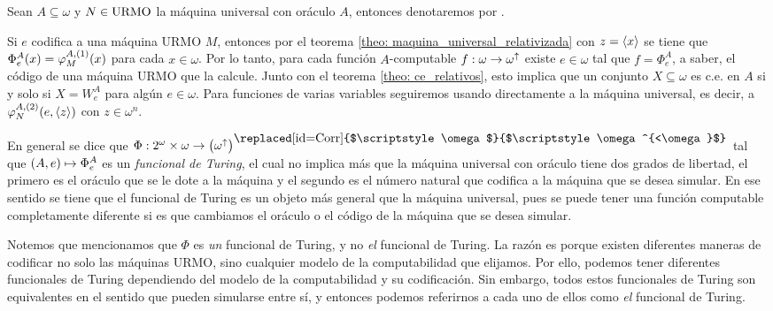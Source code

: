 \begin{agregado}
\begin{notation}
	Sean $A\subseteq\omega$ y $N\in\URMO$ la máquina universal con oráculo $A$, entonces denotaremos por .

	 
\end{notation}

\begin{correccion}
Si $e$ codifica a una máquina URMO $M$, entonces por el teorema \ref{theo: maquina_universal_relativizada} con $z =\inner*{x}$ se tiene que $\Phi_{e}^{A}\pa*{x} =\varphi_{M}^{A, (1)}\pa*{x}$ para cada $x\in\omega$. Por lo tanto, para cada función $A$-computable $f:\omega\to\omega^{\DIVERGE}$ existe $e\in\omega$ tal que $f =\Phi_{e}^{A}$, a saber, el código de una máquina URMO que la calcule. Junto con el teorema \ref{theo: ce_relativos}, esto implica que un conjunto $X\subseteq\omega$ es c.e. en $A$ si y solo si $X = W_{e}^{A}$ para algún $e\in\omega$. Para funciones de varias variables seguiremos usando directamente a la máquina universal, es decir, a $\varphi_{N}^{A, (2)}\pa*{e,\inner*{z}}$ con $z\in\omega^{n}$.
\end{correccion}

En general se dice que $\Phi:\CPOTENCIA{\omega}\times\omega\to\pa*{\omega^{\DIVERGE}}^{\mbox{\replaced[id=Corr]{$\scriptstyle\omega$}{$\scriptstyle\omega^{<\omega}$}}}$ tal que $\pa*{A, e}\mapsto\Phi_{e}^{A}$ es un \emph{funcional de Turing}, el cual no implica más que la máquina universal con oráculo tiene dos grados de libertad, el primero es el oráculo que se le dote a la máquina y el segundo es el número natural que codifica a la máquina que se desea simular. En ese sentido se tiene que el funcional de Turing es un objeto más general que la máquina universal, pues se puede tener una función computable completamente diferente si es que cambiamos el oráculo o el código de la máquina que se desea simular.

Notemos que mencionamos que $\Phi$ es \emph{un} funcional de Turing, y no \emph{el} funcional de Turing. La razón es porque existen diferentes maneras de codificar no solo las máquinas URMO, sino cualquier modelo de la computabilidad que elijamos. Por ello, podemos tener diferentes funcionales de Turing dependiendo del modelo de la computabilidad y su codificación. Sin embargo, todos estos funcionales de Turing son equivalentes en el sentido que pueden simularse entre sí, y entonces podemos referirnos a cada uno de ellos como \emph{el} funcional de Turing.


\end{agregado}
